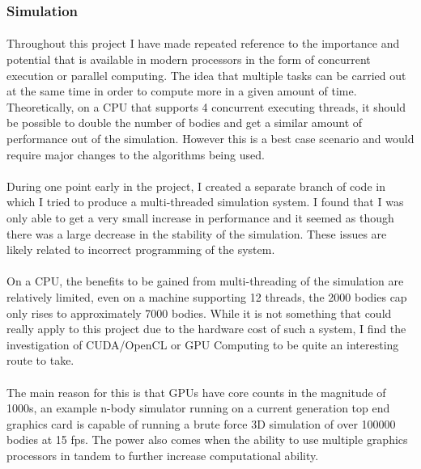 \subsubsection{Simulation}
\paragraph{}
Throughout this project I have made repeated reference to the importance and potential that is available in modern processors in the form of concurrent execution or parallel computing. The idea that multiple tasks can be carried out at the same time in order to compute more in a given amount of time. Theoretically, on a CPU that supports 4 concurrent executing threads, it should be possible to double the number of bodies and get a similar amount of performance out of the simulation. However this is a best case scenario and would require major changes to the algorithms being used.

\paragraph{}
During one point early in the project, I created a separate branch of code in which I tried to produce a multi-threaded simulation system. I found that I was only able to get a very small increase in performance and it seemed as though there was a large decrease in the stability of the simulation. These issues are likely related to incorrect programming of the system.

\paragraph{}
On a CPU, the benefits to be gained from multi-threading of the simulation are relatively limited, even on a machine supporting 12 threads, the 2000 bodies cap only rises to approximately 7000 bodies. While it is not something that could really apply to this project due to the hardware cost of such a system, I find the investigation of CUDA/OpenCL or GPU Computing to be quite an interesting route to take.

\paragraph{}
The main reason for this is that GPUs have core counts in the magnitude of 1000s, an example n-body simulator running on a current generation top end graphics card is capable of running a brute force 3D simulation of over 100000 bodies at 15 fps. The power also comes when the ability to use multiple graphics processors in tandem to further increase computational ability.

